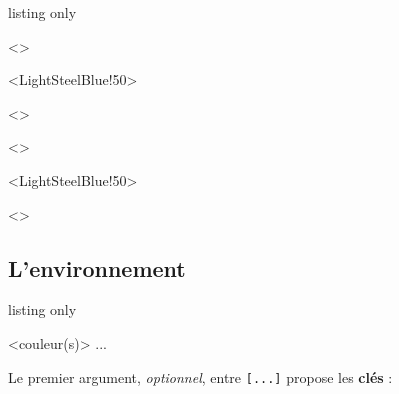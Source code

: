 \documentclass[a4paper]{article}
\newcommand\Cle[1]{{\bfseries\sffamily\textlangle #1\textrangle}}
\begin{document}
\medskip

\begin{PresentationCode}{listing only}

\AffQuadrillage[NbCarreaux=18x4,Grille=Seyes,AffBarre=false]<\CoulSeyes>

\AffQuadrillage[NbCarreaux=36x8,Elargir=3/3]<LightSteelBlue!50>

\begin{center}
	\AffQuadrillage[NbCarreaux=12x3,Elargir=2/2,Grille=Ruled,Marge=2]<\CoulRuled>
\end{center}
\end{PresentationCode}

\medskip

\AffQuadrillage[NbCarreaux=18x4,Grille=Seyes,AffBarre=false]<\CoulSeyes>

\medskip

\AffQuadrillage[NbCarreaux=36x8,Elargir=3/3]<LightSteelBlue!50>

\begin{center}
	\AffQuadrillage[NbCarreaux=12x3,Elargir=2/2,Grille=Ruled,Marge=2]<\CoulRuled>
\end{center}

\pagebreak

\subsection{L'environnement}

\begin{PresentationCode}{listing only}

\begin{EnvQuadrillage}[clés]<couleur(s)>
	...
\end{EnvQuadrillage}
\end{PresentationCode}

Le premier argument, \textit{optionnel}, entre \texttt{[...]} propose les \Cle{clés} :
\end{document}

